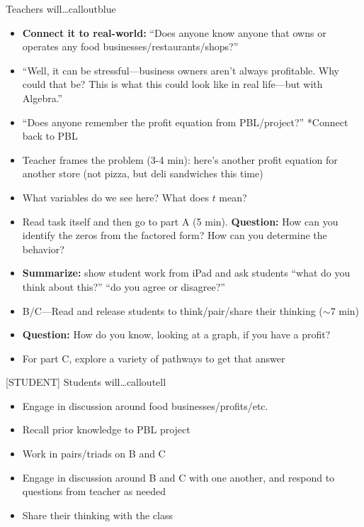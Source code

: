 \documentclass[10pt]{article}
\begin{document}
\begin{callout}{\IconSpeak{} Teachers will\ldots}{calloutblue}
\begin{itemize}[leftmargin=1.4em,itemsep=1pt,topsep=1pt]
  \item \textbf{Connect it to real-world:} ``Does anyone know anyone that owns or operates any food businesses/restaurants/shops?''
  \item ``Well, it can be stressful---business owners aren't always profitable. Why could that be? This is what this could look like in real life---but with Algebra.''
  \item ``Does anyone remember the profit equation from PBL/project?'' *Connect back to PBL
  \item Teacher frames the problem (3-4 min): here's another profit equation for another store (not pizza, but deli sandwiches this time)
  \item What variables do we see here? What does $t$ mean?
  \item Read task itself and then go to part A (5 min). \textbf{Question:} How can you identify the zeros from the factored form? How can you determine the behavior?
  \item \textbf{Summarize:} show student work from iPad and ask students ``what do you think about this?'' ``do you agree or disagree?''
  \item B/C---Read and release students to think/pair/share their thinking ($\sim$7 min)
  \item \textbf{Question:} How do you know, looking at a graph, if you have a profit?
  \item For part C, explore a variety of pathways to get that answer
\end{itemize}
\end{callout}

\begin{callout}{[STUDENT] Students will\ldots}{calloutell}
\begin{itemize}[leftmargin=1.4em,itemsep=1pt,topsep=1pt]
  \item Engage in discussion around food businesses/profits/etc.
  \item Recall prior knowledge to PBL project
  \item Work in pairs/triads on B and C
  \item Engage in discussion around B and C with one another, and respond to questions from teacher as needed
  \item Share their thinking with the class
\end{itemize}
\end{callout}
\end{document}
